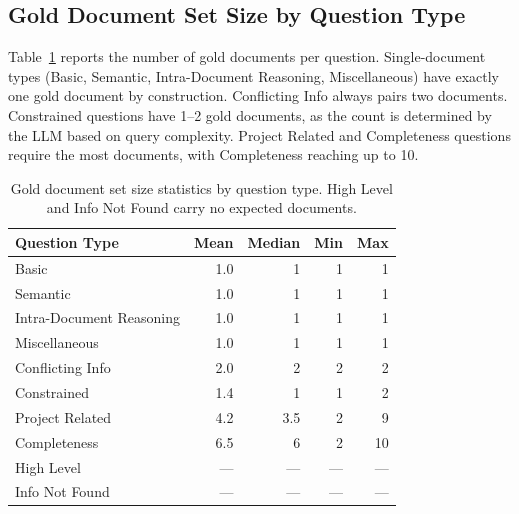 \documentclass{article}
\begin{document}
\subsection{Gold Document Set Size by Question Type}
\label{app:goldsize}

Table~\ref{tab:goldsize} reports the number of gold documents per question. Single-document types (Basic, Semantic, Intra-Document Reasoning, Miscellaneous) have exactly one gold document by construction. Conflicting Info always pairs two documents. Constrained questions have 1--2 gold documents, as the count is determined by the LLM based on query complexity. Project Related and Completeness questions require the most documents, with Completeness reaching up to 10.

\begin{table}[t]
  \caption{Gold document set size statistics by question type. High Level and Info Not Found carry no expected documents.}
  \label{tab:goldsize}
  \centering
  \begin{tabular}{lrrrr}
    \toprule
    Question Type & Mean & Median & Min & Max \\
    \midrule
    Basic                    & 1.0 & 1   & 1 & 1  \\
    Semantic                 & 1.0 & 1   & 1 & 1  \\
    Intra-Document Reasoning & 1.0 & 1   & 1 & 1  \\
    Miscellaneous            & 1.0 & 1   & 1 & 1  \\
    Conflicting Info         & 2.0 & 2   & 2 & 2  \\
    Constrained              & 1.4 & 1   & 1 & 2  \\
    Project Related          & 4.2 & 3.5 & 2 & 9  \\
    Completeness             & 6.5 & 6   & 2 & 10 \\
    High Level               & --- & --- & --- & --- \\
    Info Not Found           & --- & --- & --- & --- \\
    \bottomrule
  \end{tabular}
\end{table}
\end{document}
